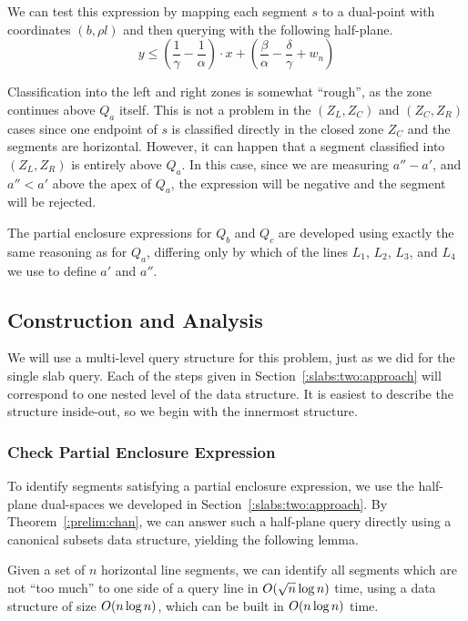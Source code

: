 \noindent We can test this expression by mapping each segment $s$ to a dual-point with coordinates $(b, \rho l)$ and then querying with the following half-plane.
\[
y \leq \left ( \frac{1}{\gamma} - \frac{1}{\alpha} \right ) \cdot x + \left ( \frac{\beta}{\alpha} - \frac{\delta}{\gamma} + w_n \right )
\]

\noindent Classification into the left and right zones is somewhat ``rough'', as the zone continues above $Q_a$ itself. 
This is not a problem in the $(Z_L, Z_C)$ and $(Z_C, Z_R)$ cases since one endpoint of $s$ is classified directly in the closed zone $Z_C$ and the segments are horizontal.
However, it can happen that a segment classified into $(Z_L, Z_R)$ is entirely above $Q_a$. 
In this case, since we are measuring $a'' - a'$, and $a'' < a'$ above the apex of $Q_a$, the expression will be negative and the segment will be rejected.

The partial enclosure expressions for $Q_b$ and $Q_c$ are developed using exactly the same reasoning as for $Q_a$, differing only by which of the lines $L_1$, $L_2$, $L_3$, and $L_4$ we use to define $a'$ and $a''$.


\subsection{Construction and Analysis}
\label{:slabs:two:analysis}

We will use a multi-level query structure for this problem, just as we did for the single slab query.
Each of the steps given in Section~\ref{:slabs:two:approach} will correspond to one nested level of the data structure.
It is easiest to describe the structure inside-out, so we begin with the innermost structure.

\subsubsection{Check Partial Enclosure Expression}

To identify segments satisfying a partial enclosure expression, we use the half-plane dual-spaces we developed in Section~\ref{:slabs:two:approach}. 
By Theorem~\ref{:prelim:chan}, we can answer such a half-plane query directly using a canonical subsets data structure, yielding the following lemma.

\begin{lemma}
\label{lem:slabs:two:step1}
Given a set of $n$ horizontal line segments, we can identify all segments which are not ``too much'' to one side of a query line in $O\!\left(\sqrt{n}\log{n}\right)$ time, using a data structure of size $O\!\left(n\log{n}\right)$, which can be built in $O\!\left(n\log{n}\right)$ time.
\end{lemma}

